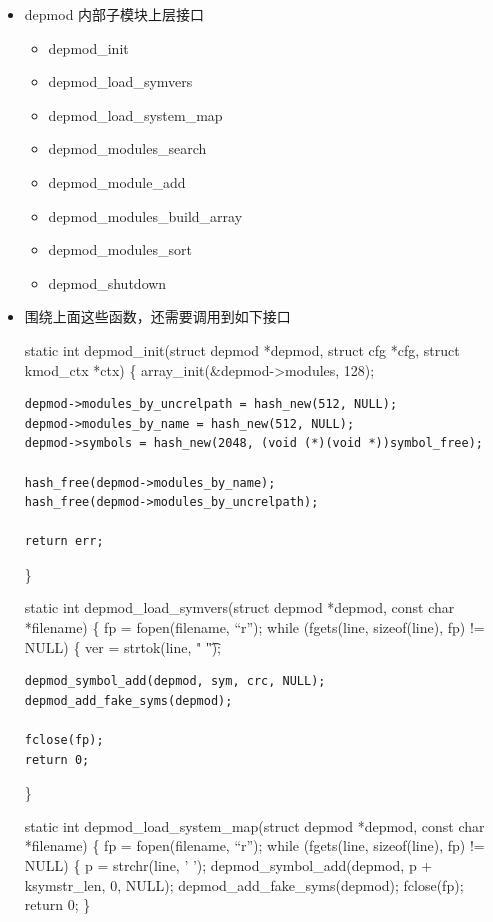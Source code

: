 \documentclass[11pt,a4paper]{article}
\begin{document}
\begin{itemize}
\item
  depmod 内部子模块上层接口
  \begin{itemize}
  \item
    depmod\_init
  \item
    depmod\_load\_symvers
  \item
    depmod\_load\_system\_map
  \item
    depmod\_modules\_search
  \item
    depmod\_module\_add
  \item
    depmod\_modules\_build\_array
  \item
    depmod\_modules\_sort
  \item
    depmod\_shutdown
  \end{itemize}
\item
  围绕上面这些函数，还需要调用到如下接口

  static int depmod\_init(struct depmod *depmod, struct cfg *cfg, struct
  kmod\_ctx *ctx) \{ array\_init(\&depmod-\textgreater{}modules, 128);

{\begin{shaded}\begin{verbatim}
depmod->modules_by_uncrelpath = hash_new(512, NULL);
depmod->modules_by_name = hash_new(512, NULL);
depmod->symbols = hash_new(2048, (void (*)(void *))symbol_free);

hash_free(depmod->modules_by_name);
hash_free(depmod->modules_by_uncrelpath);

return err;
\end{verbatim}\end{shaded}}
  \}

  static int depmod\_load\_symvers(struct depmod *depmod, const char
  *filename) \{ fp = fopen(filename, ``r''); while (fgets(line,
  sizeof(line), fp) != NULL) \{ ver = strtok(line, " \t");

{\begin{shaded}\begin{verbatim}
depmod_symbol_add(depmod, sym, crc, NULL);
depmod_add_fake_syms(depmod);

fclose(fp);
return 0;
\end{verbatim}\end{shaded}}
  \}

  static int depmod\_load\_system\_map(struct depmod *depmod, const char
  *filename) \{ fp = fopen(filename, ``r''); while (fgets(line,
  sizeof(line), fp) != NULL) \{ p = strchr(line, ' ');
  depmod\_symbol\_add(depmod, p + ksymstr\_len, 0, NULL);
  depmod\_add\_fake\_syms(depmod); fclose(fp); return 0; \}


\end{itemize}
\end{document}
